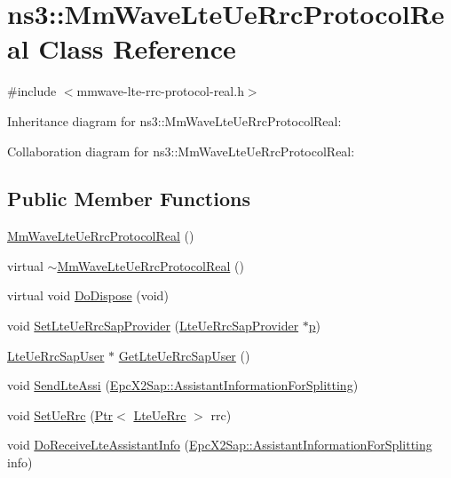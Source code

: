 \hypertarget{classns3_1_1MmWaveLteUeRrcProtocolReal}{}\section{ns3\+:\+:Mm\+Wave\+Lte\+Ue\+Rrc\+Protocol\+Real Class Reference}
\label{classns3_1_1MmWaveLteUeRrcProtocolReal}


{\ttfamily \#include $<$mmwave-\/lte-\/rrc-\/protocol-\/real.\+h$>$}



Inheritance diagram for ns3\+:\+:Mm\+Wave\+Lte\+Ue\+Rrc\+Protocol\+Real\+:


Collaboration diagram for ns3\+:\+:Mm\+Wave\+Lte\+Ue\+Rrc\+Protocol\+Real\+:
\subsection*{Public Member Functions}
\begin{DoxyCompactItemize}
\item 
\hyperlink{classns3_1_1MmWaveLteUeRrcProtocolReal_a288b582ddd957b107705be119f3bbcb4}{Mm\+Wave\+Lte\+Ue\+Rrc\+Protocol\+Real} ()
\item 
virtual \hyperlink{classns3_1_1MmWaveLteUeRrcProtocolReal_aee778a211e2ced3151269c49abc35379}{$\sim$\+Mm\+Wave\+Lte\+Ue\+Rrc\+Protocol\+Real} ()
\item 
virtual void \hyperlink{classns3_1_1MmWaveLteUeRrcProtocolReal_a6d1404b8540c07ca1d2d968a0bc0e4f8}{Do\+Dispose} (void)
\item 
void \hyperlink{classns3_1_1MmWaveLteUeRrcProtocolReal_ad4f7bd330710a9f72d13fff0ec7acdef}{Set\+Lte\+Ue\+Rrc\+Sap\+Provider} (\hyperlink{classns3_1_1LteUeRrcSapProvider}{Lte\+Ue\+Rrc\+Sap\+Provider} $\ast$\hyperlink{lte__link__budget__x2__handover__measures_8m_ac9de518908a968428863f829398a4e62}{p})
\item 
\hyperlink{classns3_1_1LteUeRrcSapUser}{Lte\+Ue\+Rrc\+Sap\+User} $\ast$ \hyperlink{classns3_1_1MmWaveLteUeRrcProtocolReal_a675e888b0ec0971c769bcc5f5c7f5857}{Get\+Lte\+Ue\+Rrc\+Sap\+User} ()
\item 
void \hyperlink{classns3_1_1MmWaveLteUeRrcProtocolReal_ad6221715cd18a1fd9fab6d92a7ce53e7}{Send\+Lte\+Assi} (\hyperlink{structns3_1_1EpcX2Sap_1_1AssistantInformationForSplitting}{Epc\+X2\+Sap\+::\+Assistant\+Information\+For\+Splitting})
\item 
void \hyperlink{classns3_1_1MmWaveLteUeRrcProtocolReal_aa88fb8294b02fd60d55e2bdd53fa6123}{Set\+Ue\+Rrc} (\hyperlink{classns3_1_1Ptr}{Ptr}$<$ \hyperlink{classns3_1_1LteUeRrc}{Lte\+Ue\+Rrc} $>$ rrc)
\item 
void \hyperlink{classns3_1_1MmWaveLteUeRrcProtocolReal_ace446d5e088e45df57e1b6af3acc6c4a}{Do\+Receive\+Lte\+Assistant\+Info} (\hyperlink{structns3_1_1EpcX2Sap_1_1AssistantInformationForSplitting}{Epc\+X2\+Sap\+::\+Assistant\+Information\+For\+Splitting} info)
\end{DoxyCompactItemize}
